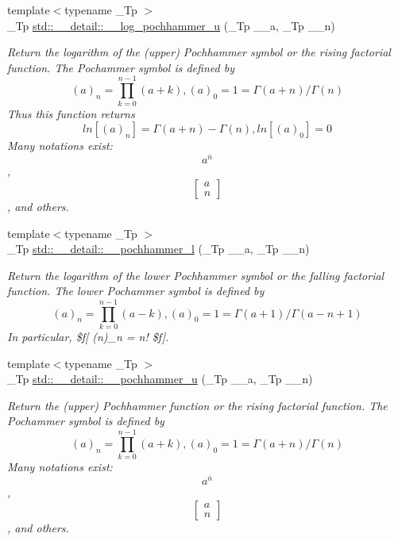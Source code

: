 \begin{DoxyCompactItemize}
{\footnotesize template$<$typename \+\_\+\+Tp $>$ }\\\+\_\+\+Tp \hyperlink{namespacestd_1_1____detail_a562403a92b80066d306b054eb319460b}{std\+::\+\_\+\+\_\+detail\+::\+\_\+\+\_\+log\+\_\+pochhammer\+\_\+u} (\+\_\+\+Tp \+\_\+\+\_\+a, \+\_\+\+Tp \+\_\+\+\_\+n)
\begin{DoxyCompactList}\small\item\em Return the logarithm of the (upper) Pochhammer symbol or the rising factorial function. The Pochammer symbol is defined by \[ (a)_n = \prod_{k=0}^{n-1} (a + k), (a)_0 = 1 = \Gamma(a + n) / \Gamma(n) \] Thus this function returns \[ ln[(a)_n] = \Gamma(a + n) - \Gamma(n), ln[(a)_0] = 0 \] Many notations exist\+: \[ a^{\overline{n}} \], \[ \left[ \begin{array}{c} a \\ n \end{array} \right] \], and others. \end{DoxyCompactList}\item 
{\footnotesize template$<$typename \+\_\+\+Tp $>$ }\\\+\_\+\+Tp \hyperlink{namespacestd_1_1____detail_a475c47b66346d11f519b43abb775e08a}{std\+::\+\_\+\+\_\+detail\+::\+\_\+\+\_\+pochhammer\+\_\+l} (\+\_\+\+Tp \+\_\+\+\_\+a, \+\_\+\+Tp \+\_\+\+\_\+n)
\begin{DoxyCompactList}\small\item\em Return the logarithm of the lower Pochhammer symbol or the falling factorial function. The lower Pochammer symbol is defined by \[ (a)_n = \prod_{k=0}^{n-1} (a - k), (a)_0 = 1 = \Gamma(a + 1) / \Gamma(a - n + 1) \] In particular, \$f\mbox{[} (n)\+\_\+n = n! \$f\mbox{]}. \end{DoxyCompactList}\item 
{\footnotesize template$<$typename \+\_\+\+Tp $>$ }\\\+\_\+\+Tp \hyperlink{namespacestd_1_1____detail_a42b5087ba4f30827767c1e733037f042}{std\+::\+\_\+\+\_\+detail\+::\+\_\+\+\_\+pochhammer\+\_\+u} (\+\_\+\+Tp \+\_\+\+\_\+a, \+\_\+\+Tp \+\_\+\+\_\+n)
\begin{DoxyCompactList}\small\item\em Return the (upper) Pochhammer function or the rising factorial function. The Pochammer symbol is defined by \[ (a)_n = \prod_{k=0}^{n-1} (a + k), (a)_0 = 1 = \Gamma(a + n) / \Gamma(n) \] Many notations exist\+: \[ a^{\overline{n}} \], \[ \left[ \begin{array}{c} a \\ n \end{array} \right] \], and others. \end{DoxyCompactList}\item 

\end{DoxyCompactItemize}

